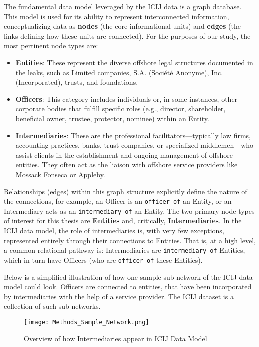 The fundamental data model leveraged by the ICIJ data is a graph database. This model is used for its ability to represent interconnected information, conceptualizing data as \textbf{nodes} (the core informational units) and \textbf{edges} (the links defining how these units are connected). For the purposes of our study, the most pertinent node types are:

\begin{itemize}
    \item \textbf{Entities}: These represent the diverse offshore legal structures documented in the leaks, such as Limited companies, S.A. (Société Anonyme), Inc. (Incorporated), trusts, and foundations.
    \item \textbf{Officers}: This category includes individuals or, in some instances, other corporate bodies that fulfill specific roles (e.g., director, shareholder, beneficial owner, trustee, protector, nominee) within an Entity.
    \item \textbf{Intermediaries}: These are the professional facilitators—typically law firms, accounting practices, banks, trust companies, or specialized middlemen—who assist clients in the establishment and ongoing management of offshore entities. They often act as the liaison with offshore service providers like Mossack Fonseca or Appleby.
\end{itemize}

Relationships (edges) within this graph structure explicitly define the nature of the connections, for example, an Officer is an \texttt{officer\_of} an Entity, or an Intermediary acts as an \texttt{intermediary\_of} an Entity. The two primary node types of interest for this thesis are \textbf{Entities} and, critically, \textbf{Intermediaries}. In the ICIJ data model, the role of intermediaries is, with very few exceptions, represented entirely through their connections to Entities. That is, at a high level, a common relational pathway is: Intermediaries are \texttt{intermediary\_of} Entities, which in turn have Officers (who are \texttt{officer\_of} these Entities).

Below is a simplified illustration of how one sample sub-network of the ICIJ data model could look. Officers are connected to entities, that have been incorporated by intermediaries with the help of a service provider. The ICIJ dataset is a collection of such sub-networks. 

\begin{figure}[htbp]
    \centering
    \texttt{[image: Methods\_Sample\_Network.png]}
    \caption{Overview of how Intermediaries appear in ICIJ Data Model}
    \label{fig:sample_network}
\end{figure}

